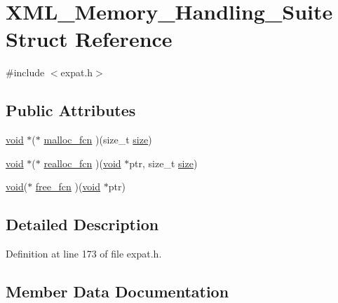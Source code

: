 \hypertarget{struct_x_m_l___memory___handling___suite}{}\section{X\+M\+L\+\_\+\+Memory\+\_\+\+Handling\+\_\+\+Suite Struct Reference}
\label{struct_x_m_l___memory___handling___suite}


{\ttfamily \#include $<$expat.\+h$>$}

\subsection*{Public Attributes}
\begin{DoxyCompactItemize}
\item 
\hyperlink{sound_8c_ae35f5844602719cf66324f4de2a658b3}{void} $\ast$($\ast$ \hyperlink{struct_x_m_l___memory___handling___suite_ac2e78cef37b336e5d7ad804b98a64f0f}{malloc\+\_\+fcn} )(size\+\_\+t \hyperlink{group__lavu__mem_ga854352f53b148adc24983a58a1866d66}{size})
\item 
\hyperlink{sound_8c_ae35f5844602719cf66324f4de2a658b3}{void} $\ast$($\ast$ \hyperlink{struct_x_m_l___memory___handling___suite_a1e7cafd4148e65aa745b72f869aa121d}{realloc\+\_\+fcn} )(\hyperlink{sound_8c_ae35f5844602719cf66324f4de2a658b3}{void} $\ast$ptr, size\+\_\+t \hyperlink{group__lavu__mem_ga854352f53b148adc24983a58a1866d66}{size})
\item 
\hyperlink{sound_8c_ae35f5844602719cf66324f4de2a658b3}{void}($\ast$ \hyperlink{struct_x_m_l___memory___handling___suite_a5da6db22e9aba955d071875a589b1b42}{free\+\_\+fcn} )(\hyperlink{sound_8c_ae35f5844602719cf66324f4de2a658b3}{void} $\ast$ptr)
\end{DoxyCompactItemize}


\subsection{Detailed Description}


Definition at line 173 of file expat.\+h.



\subsection{Member Data Documentation}
